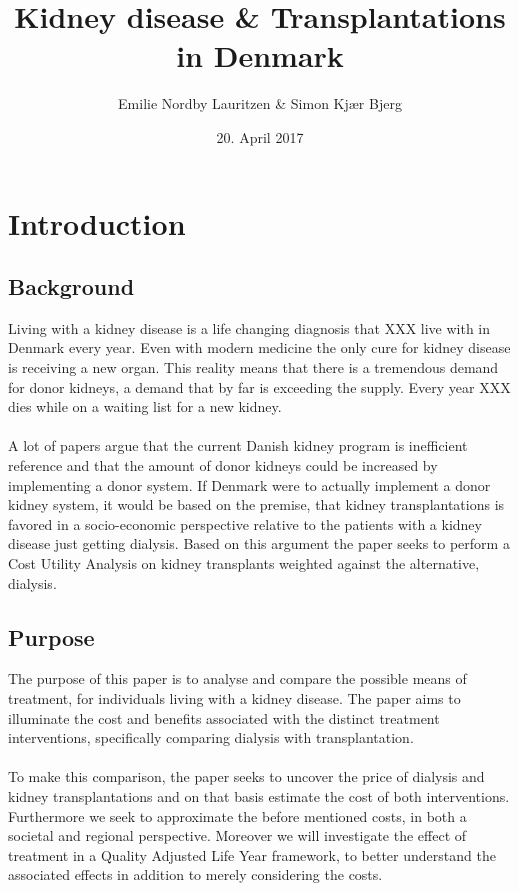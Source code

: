 \documentclass[a4paper,12pt]{article}
\title{Kidney disease \& Transplantations in Denmark}
\author{Emilie Nordby Lauritzen \& Simon Kjær Bjerg}
\date{20. April 2017}
\begin{document}
\maketitle
\newpage

\begin{abstract}
\end{abstract}	
\newpage
\tableofcontents

\newpage
\section{Introduction}

\subsection{Background}

Living with a kidney disease is a life changing diagnosis that XXX live with in Denmark every year. Even with modern medicine the only cure for kidney disease is receiving a new organ. This reality means that there is a tremendous demand for donor kidneys, a demand that by far is exceeding the supply. Every year XXX dies while on a waiting list for a new kidney. 
\\\\
A lot of papers argue that the current Danish kidney program is inefficient reference and that the amount of donor kidneys could be increased by implementing a donor system. If Denmark were to actually implement a donor kidney system, it would be based on the premise, that kidney transplantations is favored in a socio-economic perspective relative to the patients with a kidney disease just getting dialysis. Based on this argument the paper seeks to perform a Cost Utility Analysis on kidney transplants weighted against the alternative, dialysis.

\subsection{Purpose}

The purpose of this paper is to analyse and compare the possible means of treatment, for individuals living with a kidney disease. The paper aims to illuminate the cost and benefits associated with the distinct treatment interventions, specifically comparing dialysis with transplantation.
\\\\
To make this comparison, the paper seeks to uncover the price of dialysis and kidney transplantations and on that basis estimate the cost of both interventions. Furthermore we seek to approximate the before mentioned costs, in both a societal and regional perspective. Moreover we will investigate the effect of treatment in a Quality Adjusted Life Year framework, to better understand the associated effects in addition to merely considering the costs.
\end{document}
